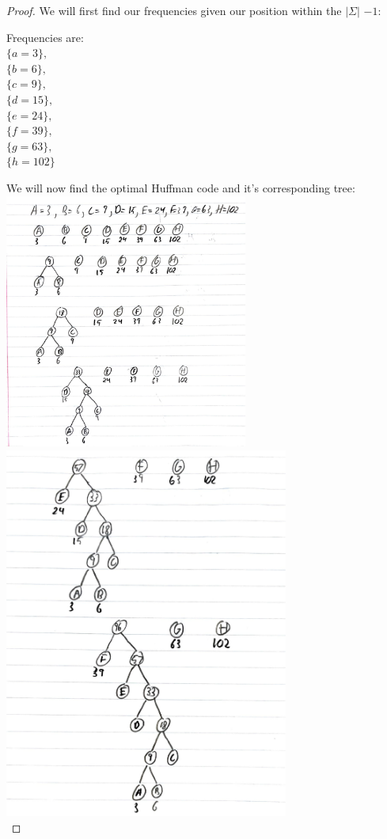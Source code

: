 \documentclass[11pt]{article}
\theoremstyle{definition}
\theoremstyle{definition}
\theoremstyle{definition}
\begin{document}
\begin{proof} 
We will first find our frequencies given our position within the $|\Sigma|$ $-1$: \\
\begin{center}
Frequencies are: \\
 $ \{a = 3\},$\\
$\{b = 6\},$ \\
$\{c = 9\},$ \\
$\{d = 15\},$ \\
$\{e = 24\},$ \\
$\{f = 39\},$ \\
$\{g = 63\},$ \\
$\{h = 102\}$ \\
\end{center}
We will now find the optimal Huffman code and it's corresponding tree: \\
\includegraphics[width=0.6\textwidth]{Huff_Hw3_CSCI3104.pdf}\\
\includegraphics[width=0.7\textwidth]{Huff1_Hw3_CSCI3104.pdf}\\

\end{proof}
\end{document}
